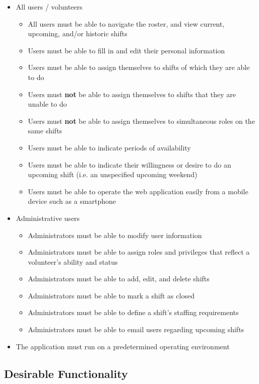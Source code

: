 \begin{itemize}
    \item All users / volunteers
    \begin{itemize}
        \item All users must be able to navigate the roster, and view current, upcoming, and/or historic shifts
        \item Users must be able to fill in and edit their personal information
        \item Users must be able to assign themselves to shifts of which they are able to do
        \item Users must \textbf{not} be able to assign themselves to shifts that they are unable to do
        \item Users must \textbf{not} be able to assign themselves to simultaneous roles on the same shifts
        \item Users must be able to indicate periods of availability
        \item Users must be able to indicate their willingness or desire to do an upcoming shift (i.e. an unspecified upcoming weekend)
        \item Users must be able to operate the web application easily from a mobile device such as a smartphone
    \end{itemize}
    \item Administrative users
    \begin{itemize}
        \item Administrators must be able to modify user information
        \item Administrators must be able to assign roles and privileges that reflect a volunteer's ability and status
        \item Administrators must be able to add, edit, and delete shifts
        \item Administrators must be able to mark a shift as closed
        \item Administrators must be able to define a shift's staffing requirements
        \item Administrators must be able to email users regarding upcoming shifts
    \end{itemize} 
    \item The application must run on a predetermined operating environment
\end{itemize}

\subsection{Desirable Functionality}
